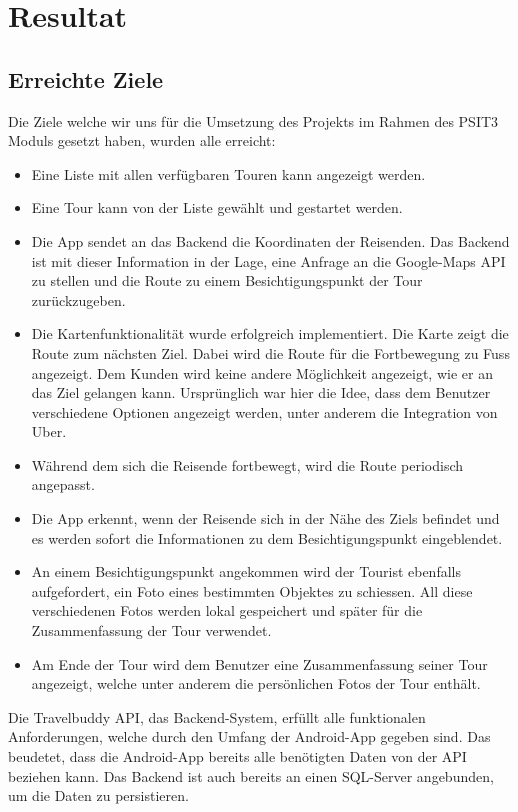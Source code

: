 \section{Resultat}
\label{resultat}
\subsection{Erreichte Ziele}
\label{erreichteZiele}
Die Ziele welche wir uns für die Umsetzung des Projekts im Rahmen des PSIT3 Moduls gesetzt haben, wurden alle erreicht:
\begin{itemize}
\item Eine Liste mit allen verfügbaren Touren kann angezeigt werden.
\item Eine Tour kann von der Liste gewählt und gestartet werden.
\item Die App sendet an das Backend die Koordinaten der Reisenden. Das Backend ist mit dieser Information in der Lage, eine Anfrage an die Google-Maps API zu stellen und die Route zu einem Besichtigungspunkt der Tour zurückzugeben.
\item Die Kartenfunktionalität wurde erfolgreich implementiert. Die Karte zeigt die Route zum nächsten Ziel. Dabei wird die Route für die Fortbewegung zu Fuss angezeigt. Dem Kunden wird keine andere Möglichkeit angezeigt, wie er an das Ziel gelangen kann. Ursprünglich war hier die Idee, dass dem Benutzer verschiedene Optionen angezeigt werden, unter anderem die Integration von Uber.
\item Während dem sich die Reisende fortbewegt, wird die Route periodisch angepasst. 
\item Die App erkennt, wenn der Reisende sich in der Nähe des Ziels befindet und es werden sofort die Informationen zu dem Besichtigungspunkt eingeblendet.
\item An einem Besichtigungspunkt angekommen wird der Tourist ebenfalls aufgefordert, ein Foto eines bestimmten Objektes zu schiessen. All diese verschiedenen Fotos werden lokal gespeichert und später für die Zusammenfassung der Tour verwendet.	
\item Am Ende der Tour wird dem Benutzer eine Zusammenfassung seiner Tour angezeigt, welche unter anderem die persönlichen Fotos der Tour enthält.
\end{itemize}

Die Travelbuddy API, das Backend-System, erfüllt alle funktionalen Anforderungen, welche durch den Umfang der Android-App gegeben sind. Das beudetet, dass die Android-App bereits alle benötigten Daten von der API beziehen kann. Das Backend ist auch bereits an einen SQL-Server angebunden, um die Daten zu persistieren. 

